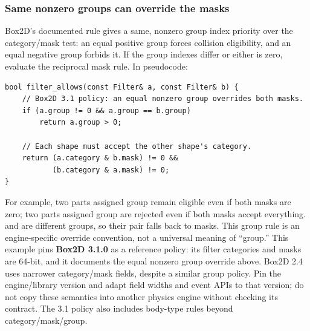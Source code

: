 \subsubsection{Same nonzero groups can override the masks}\label{05-engine-i-ch017-same-nonzero-groups-can-override-the-masks}

\hypertarget{05-engine-i-ch017-same-nonzero-groups-can-override-the-masks}{}

Box2D's documented rule gives a same, nonzero group index priority over the category/mask test: an equal positive group forces collision eligibility, and an equal negative group forbids it. If the group indexes differ or either is zero, evaluate the reciprocal mask rule. In pseudocode:

\begin{verbatim}
bool filter_allows(const Filter& a, const Filter& b) {
    // Box2D 3.1 policy: an equal nonzero group overrides both masks.
    if (a.group != 0 && a.group == b.group)
        return a.group > 0;

    // Each shape must accept the other shape's category.
    return (a.category & b.mask) != 0 &&
           (b.category & a.mask) != 0;
}
\end{verbatim}

For example, two parts assigned group  remain eligible even if both masks are zero; two parts assigned group  are rejected even if both masks accept everything.  and  are different groups, so their pair falls back to masks. This group rule is an engine-specific override convention, not a universal meaning of ``group.'' This example pins \textbf{Box2D 3.1.0} as a reference policy: its filter categories and masks are 64-bit, and it documents the equal nonzero group override above. Box2D 2.4 uses narrower category/mask fields, despite a similar group policy. Pin the engine/library version and adapt field widths and event APIs to that version; do not copy these semantics into another physics engine without checking its contract. The 3.1 policy also includes body-type rules beyond category/mask/group.

